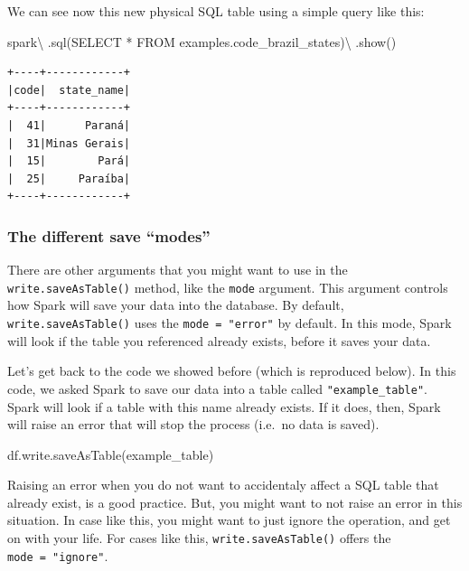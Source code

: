 \documentclass[
  11pt,
  letterpaper,
  DIV=11,
  numbers=noendperiod]{scrreprt}
\newenvironment{Shaded}{\begin{snugshade}}{\end{snugshade}}
\newcommand{\NormalTok}[1]{\textcolor[rgb]{0.00,0.23,0.31}{#1}}
\newcommand{\OperatorTok}[1]{\textcolor[rgb]{0.37,0.37,0.37}{#1}}
\newcommand{\StringTok}[1]{\textcolor[rgb]{0.13,0.47,0.30}{#1}}
\begin{document}
We can see now this new physical SQL table using a simple query like
this:

\begin{Shaded}
\begin{Highlighting}[]
\NormalTok{spark}\OperatorTok{\textbackslash{}}
\NormalTok{  .sql(}\StringTok{\textquotesingle{}SELECT * FROM examples.code\_brazil\_states\textquotesingle{}}\NormalTok{)}\OperatorTok{\textbackslash{}}
\NormalTok{  .show()}
\end{Highlighting}
\end{Shaded}

\begin{verbatim}
+----+------------+
|code|  state_name|
+----+------------+
|  41|      Paraná|
|  31|Minas Gerais|
|  15|        Pará|
|  25|     Paraíba|
+----+------------+
\end{verbatim}

\hypertarget{sec-sql-save-modes}{%
\subsubsection{The different save ``modes''}\label{sec-sql-save-modes}}

There are other arguments that you might want to use in the
\texttt{write.saveAsTable()} method, like the \texttt{mode} argument.
This argument controls how Spark will save your data into the database.
By default, \texttt{write.saveAsTable()} uses the
\texttt{mode\ =\ "error"} by default. In this mode, Spark will look if
the table you referenced already exists, before it saves your data.

Let's get back to the code we showed before (which is reproduced below).
In this code, we asked Spark to save our data into a table called
\texttt{"example\_table"}. Spark will look if a table with this name
already exists. If it does, then, Spark will raise an error that will
stop the process (i.e.~no data is saved).

\begin{Shaded}
\begin{Highlighting}[]
\NormalTok{df.write.saveAsTable(}\StringTok{\textquotesingle{}example\_table\textquotesingle{}}\NormalTok{)}
\end{Highlighting}
\end{Shaded}

Raising an error when you do not want to accidentaly affect a SQL table
that already exist, is a good practice. But, you might want to not raise
an error in this situation. In case like this, you might want to just
ignore the operation, and get on with your life. For cases like this,
\texttt{write.saveAsTable()} offers the \texttt{mode\ =\ "ignore"}.
\end{document}
